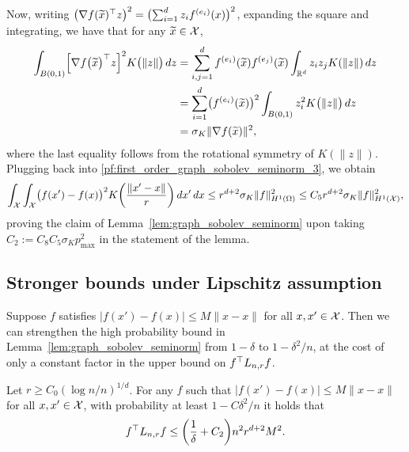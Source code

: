 Now, writing $\bigl(\nabla f(\widetilde{x}) ^{\top} z\bigr)^2 = \bigl(\sum_{i = 1}^{d} z_{i} f^{(e_i)}(x) \bigr)^2$, expanding the square and integrating, we have that for any $\widetilde{x} \in \mathcal{X}$,
\begin{align*}
\int_{B(0,1)} \Bigl[\nabla f\bigl(\widetilde{x}\bigr)^{\top} z\Bigr]^2 K\bigl(\|z\|\bigr) \,dz & = \sum_{i,j = 1}^{d} f^{(e_i)}(\widetilde{x}) f^{(e_j)}(\widetilde{x}) \int_{\mathbb{R}^d} z_iz_jK(\|z\|) \,dz \\
& = \sum_{i = 1}^{d} \bigl(f^{(e_i)}(\widetilde{x})\bigr)^2 \int_{B(0,1)} z_i^2 K\bigl(\|z\|\bigr) \,dz \\
& = \sigma_K \|\nabla f(\widetilde{x})\|^2,
\end{align*}
where the last equality follows from the rotational symmetry of $K(\|z\|)$. Plugging back into \eqref{pf:first_order_graph_sobolev_seminorm_3}, we obtain
\begin{equation*}
\int_{\mathcal{X}} \int_{\mathcal{X}} \bigl(f(x') - f(x)\bigr)^2 K\biggl(\frac{\|x' - x\|}{r}\biggr) \,dx' \,dx \leq r^{d + 2} \sigma_K \|f\|_{H^1(\Omega)}^2 \leq C_5 r^{d + 2} \sigma_K \|f\|_{H^1(\mathcal{X})}^2,
\end{equation*}
proving the claim of Lemma~\ref{lem:graph_sobolev_seminorm} upon taking $C_2 := C_8C_5 \sigma_K p_{\max}^2$ in the statement of the lemma.

\subsection{Stronger bounds under Lipschitz assumption}

Suppose $f$ satisfies $|f(x') - f(x)| \leq M \|x - x\|$ for all $x,x' \in \mathcal{X}$. Then we can strengthen the high probability bound in Lemma~\ref{lem:graph_sobolev_seminorm} from $1 - \delta$ to $1 - \delta^2/n$, at the cost of only a constant factor in the upper bound on $f^{\top} L_{n,r} f$.
\begin{proposition}
	\label{prop:graph_sobolev_seminorm_lipschitz}
	Let $r \geq C_0(\log n/n)^{1/d}$. For any $f$ such that $|f(x') - f(x)| \leq M \|x - x\|$ for all $x,x' \in \mathcal{X}$, with probability at least $1 - C\delta^2/n$ it holds that
	\begin{equation*}
	f^{\top} L_{n,r} f \leq \biggl(\frac{1}{\delta} + C_2\biggr) n^2 r^{d + 2} M^2.
	\end{equation*}
\end{proposition}


